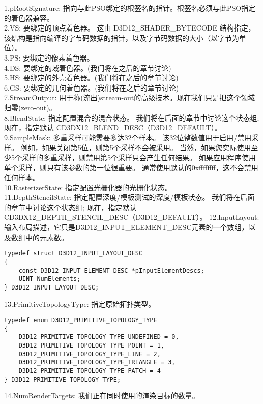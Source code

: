 \begin{flushleft}
1.pRootSignature: 指向与此PSO绑定的根签名的指针。根签名必须与此PSO指定的着色器兼容。\\
2.VS: 要绑定的顶点着色器。 这由 D3D12\_SHADER\_BYTECODE 结构指定，该结构是指向编译的字节码数据的指针，以及字节码数据的大小（以字节为单位）。\\
3.PS: 要绑定的像素着色器。\\
4.DS: 要绑定的域着色器。(我们将在之后的章节讨论)\\
5.HS: 要绑定的外壳着色器。(我们将在之后的章节讨论)\\
6.GS: 要绑定的几何着色器。(我们将在之后的章节讨论)\\
7.StreamOutput: 用于称(流出)stream-out的高级技术。现在我们只是把这个领域归零(zero-out)。\\
8.BlendState: 指定配置混合的混合状态。 我们将在后面的章节中讨论这个状态组; 现在，指定默认 CD3DX12\_BLEND\_DESC（D3D12\_DEFAULT）。\\
9.SampleMask: 多重采样可能需要多达32个样本。 该32位整数值用于启用/禁用采样。 例如，如果关闭第5位，则第5个采样不会被采用。 当然，如果您实际使用至少5个采样的多重采样，则禁用第5个采样只会产生任何结果。 如果应用程序使用单个采样，则只有该参数的第一位很重要。 通常使用默认的0xffffffff，这不会禁用任何样本。\\
10.RasterizerState: 指定配置光栅化器的光栅化状态。\\
11.DepthStencilState: 指定配置深度/模板测试的深度/模板状态。 我们将在后面的章节中讨论这个状态组; 现在，指定默认CD3DX12\_DEPTH\_STENCIL\_DESC（D3D12\_DEFAULT）。
12.InputLayout: 输入布局描述，它只是D3D12\_INPUT\_ELEMENT\_DESC元素的一个数组，以及数组中的元素数。\\
\begin{lstlisting}
typedef struct D3D12_INPUT_LAYOUT_DESC
{
    const D3D12_INPUT_ELEMENT_DESC *pInputElementDescs;
    UINT NumElements;
} D3D12_INPUT_LAYOUT_DESC;
\end{lstlisting}
13.PrimitiveTopologyType: 指定原始拓扑类型。\\
\begin{lstlisting}
typedef enum D3D12_PRIMITIVE_TOPOLOGY_TYPE
{
    D3D12_PRIMITIVE_TOPOLOGY_TYPE_UNDEFINED = 0,
    D3D12_PRIMITIVE_TOPOLOGY_TYPE_POINT = 1,
    D3D12_PRIMITIVE_TOPOLOGY_TYPE_LINE = 2,
    D3D12_PRIMITIVE_TOPOLOGY_TYPE_TRIANGLE = 3,
    D3D12_PRIMITIVE_TOPOLOGY_TYPE_PATCH = 4
} D3D12_PRIMITIVE_TOPOLOGY_TYPE;
\end{lstlisting}
14.NumRenderTargets: 我们正在同时使用的渲染目标的数量。\\

\end{flushleft}
